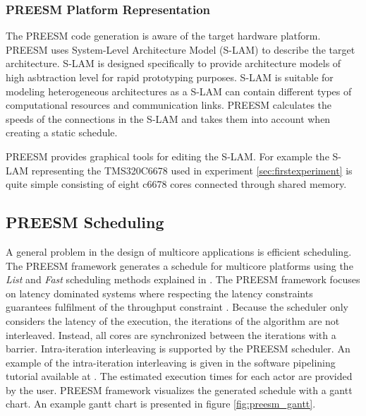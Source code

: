 \subsubsection{PREESM Platform Representation}
The PREESM code generation is aware of the target hardware platform. PREESM uses System-Level Architecture Model (S-LAM) \cite{pelcat2009system} to describe the target architecture. S-LAM is designed specifically to provide architecture models of high asbtraction level for rapid prototyping purposes. S-LAM is suitable for modeling heterogeneous architectures as a S-LAM can contain different types of computational resources and communication links. PREESM calculates the speeds of the connections in the S-LAM and takes them into account when creating a static schedule. \cite{pelcat2009system}

PREESM provides graphical tools for editing the S-LAM. For example the S-LAM representing the TMS320C6678 used in experiment \ref{sec:firstexperiment} is quite simple consisting of eight c6678 cores connected through shared memory.

\subsection{PREESM Scheduling}
\label{sec:preesmsched}
A general problem in the design of multicore applications is efficient scheduling. The PREESM framework generates a schedule for multicore platforms using the \textit{List} and \textit{Fast} scheduling methods explained in \cite{kwok1997high}. The PREESM framework focuses on latency dominated systems where respecting the latency constraints guarantees fulfilment of the throughput constraint \cite{pelcat2014preesm, ghamarian2006throughput}. Because the scheduler only considers the latency of the execution, the iterations of the algorithm are not interleaved. Instead, all cores are synchronized between the iterations with a barrier. Intra-iteration interleaving is supported by the PREESM scheduler. \cite{pelcat2014preesm} An example of the intra-iteration interleaving is given in the software pipelining tutorial available at \cite{preesm} . The estimated execution times for each actor are provided by the user. PREESM framework visualizes the generated schedule with a gantt chart. An example gantt chart is presented in figure \ref{fig:preesm_gantt}.\\ 
